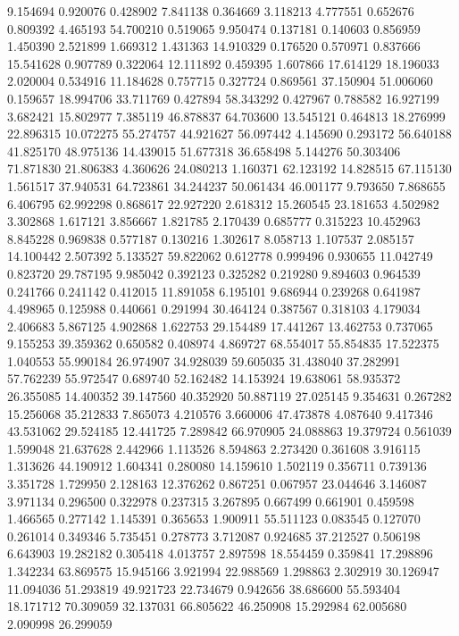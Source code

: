9.154694
0.920076
0.428902
7.841138
0.364669
3.118213
4.777551
0.652676
0.809392
4.465193
54.700210
0.519065
9.950474
0.137181
0.140603
0.856959
1.450390
2.521899
1.669312
1.431363
14.910329
0.176520
0.570971
0.837666
15.541628
0.907789
0.322064
12.111892
0.459395
1.607866
17.614129
18.196033
2.020004
0.534916
11.184628
0.757715
0.327724
0.869561
37.150904
51.006060
0.159657
18.994706
33.711769
0.427894
58.343292
0.427967
0.788582
16.927199
3.682421
15.802977
7.385119
46.878837
64.703600
13.545121
0.464813
18.276999
22.896315
10.072275
55.274757
44.921627
56.097442
4.145690
0.293172
56.640188
41.825170
48.975136
14.439015
51.677318
36.658498
5.144276
50.303406
71.871830
21.806383
4.360626
24.080213
1.160371
62.123192
14.828515
67.115130
1.561517
37.940531
64.723861
34.244237
50.061434
46.001177
9.793650
7.868655
6.406795
62.992298
0.868617
22.927220
2.618312
15.260545
23.181653
4.502982
3.302868
1.617121
3.856667
1.821785
2.170439
0.685777
0.315223
10.452963
8.845228
0.969838
0.577187
0.130216
1.302617
8.058713
1.107537
2.085157
14.100442
2.507392
5.133527
59.822062
0.612778
0.999496
0.930655
11.042749
0.823720
29.787195
9.985042
0.392123
0.325282
0.219280
9.894603
0.964539
0.241766
0.241142
0.412015
11.891058
6.195101
9.686944
0.239268
0.641987
4.498965
0.125988
0.440661
0.291994
30.464124
0.387567
0.318103
4.179034
2.406683
5.867125
4.902868
1.622753
29.154489
17.441267
13.462753
0.737065
9.155253
39.359362
0.650582
0.408974
4.869727
68.554017
55.854835
17.522375
1.040553
55.990184
26.974907
34.928039
59.605035
31.438040
37.282991
57.762239
55.972547
0.689740
52.162482
14.153924
19.638061
58.935372
26.355085
14.400352
39.147560
40.352920
50.887119
27.025145
9.354631
0.267282
15.256068
35.212833
7.865073
4.210576
3.660006
47.473878
4.087640
9.417346
43.531062
29.524185
12.441725
7.289842
66.970905
24.088863
19.379724
0.561039
1.599048
21.637628
2.442966
1.113526
8.594863
2.273420
0.361608
3.916115
1.313626
44.190912
1.604341
0.280080
14.159610
1.502119
0.356711
0.739136
3.351728
1.729950
2.128163
12.376262
0.867251
0.067957
23.044646
3.146087
3.971134
0.296500
0.322978
0.237315
3.267895
0.667499
0.661901
0.459598
1.466565
0.277142
1.145391
0.365653
1.900911
55.511123
0.083545
0.127070
0.261014
0.349346
5.735451
0.278773
3.712087
0.924685
37.212527
0.506198
6.643903
19.282182
0.305418
4.013757
2.897598
18.554459
0.359841
17.298896
1.342234
63.869575
15.945166
3.921994
22.988569
1.298863
2.302919
30.126947
11.094036
51.293819
49.921723
22.734679
0.942656
38.686600
55.593404
18.171712
70.309059
32.137031
66.805622
46.250908
15.292984
62.005680
2.090998
26.299059
